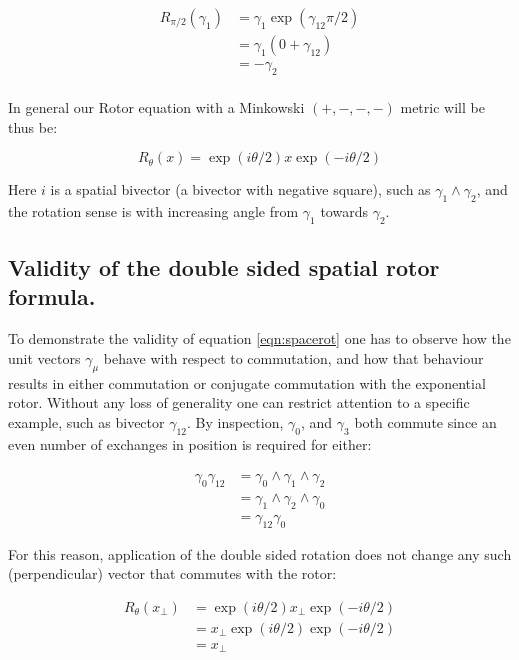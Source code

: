 \documentclass{article}      %
\begin{document}
\begin{align*}
R_{\pi/2}(\gamma_1)
&= \gamma_1 \exp({ \gamma_{12} \pi/2 }) \\
&= \gamma_1 (0 + \gamma_{12}) \\
&= -\gamma_2 \\
\end{align*}

In general our Rotor equation with a Minkowski $(+,-,-,-)$ metric will be thus be:

\begin{equation}\label{eqn:spacerot}
R_{\theta}(x) = \exp( i\theta/2) x \exp( -i\theta/2)
\end{equation}

Here $i$ is a spatial bivector (a bivector with negative square), such as $\gamma_{1}\wedge\gamma_{2}$, and the rotation sense is with increasing angle from $\gamma_1$ towards $\gamma_2$.

\subsection{ Validity of the double sided spatial rotor formula. }

To demonstrate the validity of equation \ref{eqn:spacerot} one has to observe how the unit vectors $\gamma_{\mu}$ behave with respect to commutation, and how that behaviour results in either commutation or conjugate commutation with the exponential rotor.  Without any loss of generality one can restrict attention to a specific example, such as bivector $\gamma_{12}$.  By inspection, $\gamma_0$, and $\gamma_3$ both commute since an even number of exchanges in position is required for either:

\begin{align*}
\gamma_{0} \gamma_{12} 
&= \gamma_{0} \wedge \gamma_{1} \wedge \gamma_{2} \\
&= \gamma_{1} \wedge \gamma_{2} \wedge \gamma_{0} \\
&= \gamma_{12} \gamma_0
\end{align*}

For this reason, application of the double sided rotation does not change any such (perpendicular) vector that commutes with the rotor:

\begin{align*}
R_{\theta}(x_{\perp}) 
&= \exp( i\theta/2) x_{\perp} \exp( -i\theta/2) \\
&= x_{\perp} \exp( i\theta/2) \exp( -i\theta/2) \\
&= x_{\perp}
\end{align*}
\end{document}
